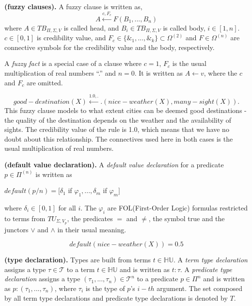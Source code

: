 \documentclass[main.tex]{subfiles}
\begin{document}
\begin{defin}\textbf{(fuzzy clauses).}
\label{def:FuzzyClauses}
A fuzzy clause is written as,
\[A \stackrel{c,F_c}{\leftarrow} F(B_1,...,B_n)\]
where $A \in TB_{\Pi,\Sigma,V}$ is called head, and $B_i \in TB_{\Pi,\Sigma,V}$ is called body, $i \in [1,n]$. $c \in [0,1]$ is credibility value, and $F_c \in \{\&_1,...,\&_k\}\subset\Omega^{(2)}$ and $F\in\Omega^{(n)}$ are connective symbols for the credibility value and the body, respectively. 

A \textit{fuzzy fact} is a special case of a clause where $c=1$, $F_c$ is the usual multiplication of real numbers ``.'' and $n=0$. It is written as $A \leftarrow v$, where the $c$ and $F_c$ are omitted.
\end{defin}

\begin{ex}
\label{ex:FuzzyClauses}
\[good-destination(X) \stackrel{1.0,.}{\leftarrow} .(nice-weather(X),many-sight(X)).\]
This fuzzy clause models to what extent cities can be deemed good destinations - the quality of the destination depends on the weather and the availability of sights. The credibility value of the rule is 1.0, which means that we have no doubt about this relationship. The connectives used here in both cases is the usual multiplication of real numbers.
\end{ex}

\begin{defin}\textbf{(default value declaration).}
\label{def:DefaultValueDecl}
A \textit{default value declaration} for a predicate $p \in \Pi^{(n)}$ is written as
\begin{center}
 $default(p/n)= [\delta_1$ if $\varphi_1, ..., \delta_m$ if $\varphi_m]$
\end{center}
where $\delta_i\in[0,1]$ for all $i$. The $\varphi_i$ are FOL(First-Order Logic) formulas restricted to terms from $TU_{\Sigma,V_p}$, the predicates $=$ and $\neq$, the symbol true and the junctors $\vee$ and $\wedge$ in their usual meaning.
\end{defin}

\begin{ex}
\label{ex:DefaultValueDecl}
 \[default(nice-weather(X)) = 0.5\]
\end{ex}

\begin{defin}\textbf{(type declaration).}
\label{def:TypeDecl}
Types are built from terms $t \in \mathbb{HU}$. A \textit{term type declaration} assigns a type $\tau \in \mathcal{T}$ to a term $t \in \mathbb{HU}$ and is written as $t : \tau$. A \textit{predicate type declaration} assigns a type $(\tau_1, ..., \tau_n) \in \mathcal{T}^n$ to a predicate $p \in \Pi^n$ and is written as $p : (\tau_1, ..., \tau_n)$, where $\tau_i$ is the type of $p$'s $i-th$ argument. The set composed by all term type declarations and predicate type declarations is denoted by $T$.
\end{defin}
\end{document}
